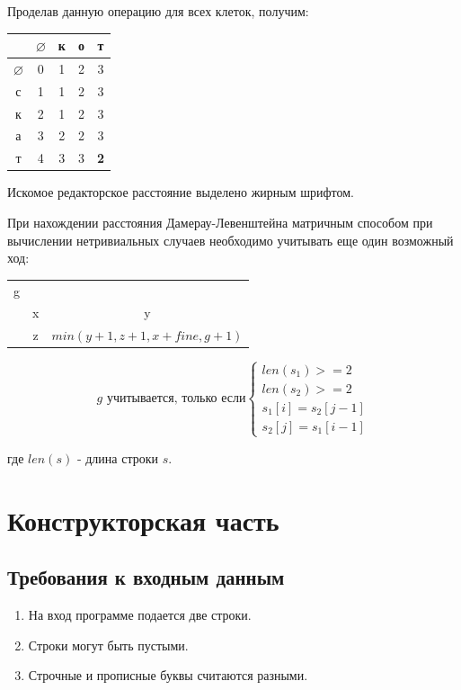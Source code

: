 \documentclass[14pt]{report}
\begin{document}
Проделав данную операцию для всех клеток, получим:

\begin{tabular}{ | c || c | c | c | c | }
\hline
    & $\varnothing$ & к & о & т \\ \hline \hline
	$\varnothing$ & 0 & 1 & 2 & 3 \\ \hline
	с & 1 & 1 & 2 & 3 \\ \hline
  к & 2 & 1 & 2 & 3 \\ \hline
  а & 3 & 2 & 2 & 3 \\ \hline
  т & 4 & 3 & 3 & {\bf2} \\ \hline
\end{tabular}

Искомое редакторское расстояние выделено жирным шрифтом.

При нахождении расстояния Дамерау-Левенштейна матричным способом при вычислении нетривиальных случаев необходимо учитывать еще один возможный ход:

\begin{tabular}{ | c | c | c |}
\cline{1-1}
  g \\ \cline{1-1} \cline{1-2} \cline{1-3}
  \multicolumn{1}{c|}{} & x & y \\ \cline{2-1} \cline{3-1}
	\multicolumn{1}{c|}{} & z & $min(y + 1, z + 1, x + fine, g + 1)$ \\ \cline{2-1} \cline{3-1}
\end{tabular}


\begin{equation*}
\text {$g$ учитывается, только если}
 \begin{cases}
	 len(s_{1}) >= 2 \\
	 len(s_{2}) >= 2 \\
	 s_{1}[i] = s_{2}[j-1] \\
   s_{2}[j] = s_{1}[i-1]
 \end{cases}
\end{equation*}

где $len(s)$ - длина строки $s$.

\chapter*{Конструкторская часть}

\section*{Требования к входным данным}
\begin{enumerate}
	\item На вход программе подается две строки.
	\item Строки могут быть пустыми.
	\item Строчные и прописные буквы считаются разными.
\end{enumerate}
\end{document}
